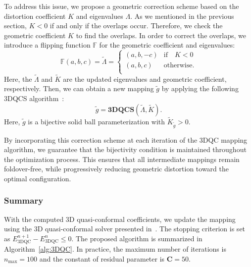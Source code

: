 \documentclass{article}
\begin{document}
To address this issue, we propose a geometric correction scheme based on the distortion coefficient $K$ and eigenvalues $\Lambda$. As we mentioned in the previous section, $K<0$ if and only if the overlaps occur. Therefore, we check the geometric coefficient $K$ to find the overlaps. In order to correct the overlaps, we introduce a flipping function $\mathbb F$ for the geometric coefficient and eigenvalues:
\begin{equation}\label{eqt:flipping}
        \mathbb F(a,b,c) = \widetilde{\Lambda} = 
      \left \{
    \begin{array}{ll}
     (a,b,-c)    & \text{if} \quad K < 0 \\
     (a,b,c)     & \text{otherwise}. \\
    \end{array}  
    \right.
\end{equation}
Here, the $\widetilde{\Lambda}$ and $\widetilde{K}$ are the updated eigenvalues and geometric coefficient, respectively. 
Then, we can obtain a new mapping $\widetilde{g}$ by applying the following 3DQCS algorithm~\cite{chen2024novel3dmappingrepresentation}:
\begin{equation}\label{eqt:3dqcs_correct}
    \widetilde{g} = \textbf{3DQCS}(\widetilde{\Lambda}, \widetilde{K}).
\end{equation}
Here, $\widetilde{g}$ is a bijective solid ball parameterization with $\widetilde{K}_{\widetilde{g}} > 0$.

By incorporating this correction scheme at each iteration of the 3DQC mapping algorithm, we guarantee that the bijectivity condition is maintained throughout the optimization process. This ensures that all intermediate mappings remain foldover-free, while progressively reducing geometric distortion toward the optimal configuration.



\subsubsection{Summary}
With the computed 3D quasi-conformal coefficients, we update the mapping using the 3D quasi-conformal solver presented in~\cite{chen2024novel3dmappingrepresentation}. The stopping criterion is set as $E^{n+1}_{\text{3DQC}} - E^{n}_{\text{3DQC}} \leq 0$. The proposed algorithm is summarized in Algorithm~\ref{alg:3DQC}. In practice, the maximum number of iterations is $n_{\text{max}} = 100$ and the constant of residual parameter is $\mathbf{C} = 50$.
\end{document}
